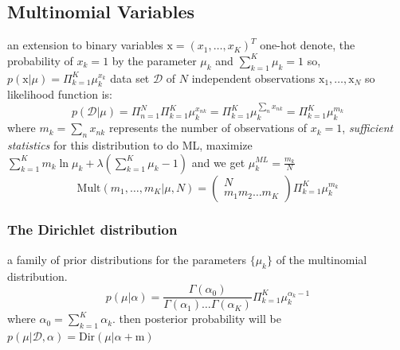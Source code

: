\documentclass[a4paper]{book}
\begin{document}
\subsection{Multinomial Variables}
an extension to binary variables\newline
$\mathrm x = (x_1,\dots,x_K)^T$ one-hot\newline
denote, the probability of $x_k = 1$ by the parameter $\mu_k$ and $\sum_{k=1}^K\mu_k = 1$\newline
so, $p(\mathrm x|\mu) = \Pi_{k=1}^K\mu_k^{x_k}$\newline
data set $\mathcal D$ of $N$ independent observations $\mathrm x_1, \dots, \mathrm x_N$\newline
so likelihood function is:
\begin{equation}\label{1.2.5}
  p(\mathcal D|\mu) = \Pi_{n=1}^N\Pi_{k=1}^K\mu_k^{x_{nk}} = \Pi_{k=1}^K\mu_k^{\sum_nx_{nk}} = \Pi_{k=1}^K\mu_k^{m_k}
\end{equation}
where $m_k = \sum_nx_{nk}$ represents the number of observations of $x_k = 1$, \emph{sufficient statistics} for this distribution\newline
to do ML, maximize $\sum_{k=1}^Km_k\ln \mu_k+\lambda(\sum_{k=1}^K\mu_k-1)$ and we get $\mu_k^{ML} = \frac{m_k}{N}$
\begin{equation}\label{1.2.6}
  \mathrm {Mult}(m_1,\dots,m_K|\mu,N) = \left(\begin{matrix}N\\m_1m_2\dots m_K\end{matrix}\right)\Pi_{k=1}^K\mu_k^{m_k}
\end{equation}
\subsubsection{The Dirichlet distribution}
a family of prior distributions for the parameters $\{\mu_k\}$ of the multinomial distribution.
\begin{equation}\label{1.2.7}
  p(\mu|\alpha) = \frac{\Gamma(\alpha_0)}{\Gamma(\alpha_1)\dots\Gamma(\alpha_K)}\Pi_{k=1}^K\mu_k^{\alpha_k-1}
\end{equation}
 where $\alpha_0 = \sum_{k=1}^K\alpha_k$.
then posterior probability will be $p(\mu|\mathcal D, \alpha) = \mathrm {Dir}(\mu|\alpha+\mathrm m)$
\end{document}
